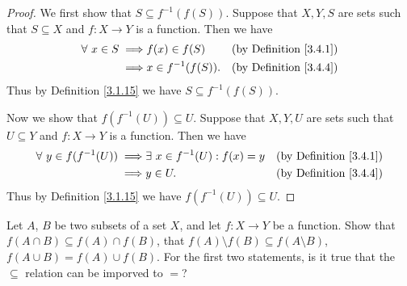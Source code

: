 \begin{proof}
    We first show that \(S \subseteq f^{-1}(f(S))\).
    Suppose that \(X, Y, S\) are sets such that \(S \subseteq X\) and \(f : X \to Y\) is a function.
    Then we have
    \begin{align*}
        \forall\ x \in S \implies & f(x) \in f(S)       & \text{(by Definition \ref{3.4.1})} \\
        \implies                  & x \in f^{-1}(f(S)). & \text{(by Definition \ref{3.4.4})}
    \end{align*}
    Thus by Definition \ref{3.1.15} we have \(S \subseteq f^{-1}(f(S))\).

    Now we show that \(f(f^{-1}(U)) \subseteq U\).
    Suppose that \(X, Y, U\) are sets such that \(U \subseteq Y\) and \(f : X \to Y\) is a function.
    Then we have
    \begin{align*}
        \forall\ y \in f(f^{-1}(U)) \implies & \exists\ x \in f^{-1}(U) : f(x) = y & \text{(by Definition \ref{3.4.1})} \\
        \implies                             & y \in U.                            & \text{(by Definition \ref{3.4.4})}
    \end{align*}
    Thus by Definition \ref{3.1.15} we have \(f(f^{-1}(U)) \subseteq U\).
\end{proof}

\begin{exercise}\label{ex 3.4.3}
    Let \(A\), \(B\) be two subsets of a set \(X\), and let \(f : X \to Y\) be a function.
    Show that \(f(A \cap B) \subseteq f(A) \cap f(B)\), that \(f(A) \setminus f(B) \subseteq f(A \setminus B)\), \(f(A \cup B) = f(A) \cup f(B)\).
    For the first two statements, is it true that the \(\subseteq\) relation can be imporved to \(=\)?
\end{exercise}

